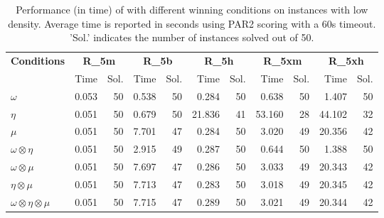 \documentclass[runningheads]{llncs}
\begin{document}
\begin{table}[ht]
\centering
\caption{Performance (in time) of \nocq with different winning conditions on instances with low density. Average time is reported in seconds using PAR2 scoring with a 60s timeout. 'Sol.' indicates the number of instances solved out of 50.}
\setlength{\tabcolsep}{1.2mm}
{\small 
\begin{tabular}{l|rr|rr|rr|rr|rr}
\toprule
\textbf{Conditions} & \multicolumn{2}{c|}{\textbf{R\_5m}} & \multicolumn{2}{c|}{\textbf{R\_5b}} & \multicolumn{2}{c|}{\textbf{R\_5h}} & \multicolumn{2}{c|}{\textbf{R\_5xm}} & \multicolumn{2}{c}{\textbf{R\_5xh}} \\
& Time & Sol. & Time & Sol. & Time & Sol. & Time & Sol. & Time & Sol. \\
\midrule
\textbf{$\omega$}
    & 0.053 & 50 & 0.538 & 50 & 0.284 & 50 & 0.638 & 50 & 1.407 & 50 \\
\textbf{$\eta$}
    & 0.051 & 50 & 0.679 & 50 & 21.836& 41 & 53.160& 28 & 44.102& 32 \\
\textbf{$\mu$}
    & 0.051 & 50 & 7.701 & 47 & 0.284 & 50 & 3.020 & 49 & 20.356& 42 \\
\textbf{$\omega \otimes \eta$}
    & 0.051 & 50 & 2.915 & 49 & 0.287 & 50 & 0.644 & 50 & 1.388 & 50 \\
\textbf{$\omega \otimes \mu$}
    & 0.051 & 50 & 7.697 & 47 & 0.286 & 50 & 3.033 & 49 & 20.343& 42 \\
\textbf{$\eta \otimes \mu$}
    & 0.051 & 50 & 7.713 & 47 & 0.283 & 50 & 3.018 & 49 & 20.345& 42 \\
\textbf{$\omega \otimes \eta \otimes \mu$}
    & 0.051 & 50 & 7.715 & 47 & 0.289 & 50 & 3.021 & 49 & 20.344& 42 \\
\bottomrule
\end{tabular}
}
\label{tab:quantitative-small}
\end{table}
\end{document}
